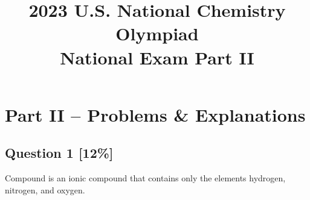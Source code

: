 \documentclass{article}
\begin{document}
\title{2023 U.S. National Chemistry Olympiad \\ National Exam Part II}
\date{}
\maketitle

\section*{Part II -- Problems \& Explanations}

\subsection*{Question 1 [12\%]}
Compound  is an ionic compound that contains only the elements hydrogen, nitrogen, and oxygen.
\end{document}
